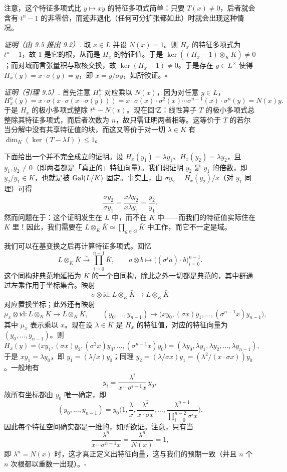 注意，这个特征多项式比 $y\mapsto xy$ 的特征多项式简单：只要 $T(x)\neq 0$，后者就会含有 $t^n-1$ 的非零倍，而迹非退化（任何可分扩张都如此）时就会出现这种情况。

\textit{证明（由 9.5 推出 9.2）.} 取 $x\in L$ 并设 $N(x)=1$。则 $H_x$ 的特征多项式为 $t^n-1$，故 $1$ 是它的根，从而是 $H_x$ 的特征值。于是 $\ker((H_x-1)\otimes_K\bar K)\neq 0$；而对域而言张量积与取核交换，故 $\ker(H_x-1)\neq 0$。于是存在 $y\in L^\times$ 使得 $H_x(y)=x\cdot\sigma(y)=y$，即 $x=y/\sigma y$，如所欲证。\hfill$\square$

\textit{证明（引理 9.5）.} 首先注意 $H_x^n$ 对应乘以 $N(x)$，因为对任意 $y\in L$，
\[
H_x^n(y)=x\cdot\sigma(x\cdot\sigma(x\cdots\sigma(y)))=x\cdot\sigma(x)\cdot\sigma^2(x)\cdots\sigma^{n-1}(x)\cdot\sigma^n(y)=N(x)y .
\]
于是 $H_x$ 的极小多项式整除 $t^n-N(x)$。现在回忆：线性算子 $T$ 的极小多项式总整除其特征多项式，而后者次数为 $n$，故只需证明两者相等。这等价于 $T$ 的若尔当分解中没有共享特征值的块，而这又等价于对一切 $\lambda\in K$ 有 $\dim_K(\ker(T-\lambda I))\le 1$。

下面给出一个并不完全成立的证明。设 $H_x(y_1)=\lambda y_1$、$H_x(y_2)=\lambda y_2$，且 $y_1,y_2\neq 0$（即两者都是「真正的」特征向量）。我们想证明 $y_2$ 是 $y_1$ 的倍数，即 $y_2/y_1\in K$，也就是被 $\operatorname{Gal}(L/K)$ 固定。事实上，由 $\sigma y_2=H_x(y_2)/x$（对 $y_1$ 同理）可得
\[
\frac{\sigma y_2}{\sigma y_1}=\frac{x\lambda y_2}{x\lambda y_1}=\frac{y_2}{y_1}.
\]
然而问题在于：这个证明发生在 $L$ 中，而不在 $K$ 中——而我们的特征值实际住在 $K$ 里！因此，我们需要在 $L\otimes_K\bar K\simeq\prod_{g\in G}\bar K$ 中工作，而它不一定是域。

我们可以在基变换之后再计算特征多项式。回忆
\[
L\otimes_K\bar K\xrightarrow{\sim}\prod_{i=0}^{n-1}\bar K,\qquad a\otimes b\mapsto\big((\sigma^ia)\cdot b\big)_{i=0}^{n-1}.
\]
这个同构非典范地延拓为 $\bar K$ 的一个自同构，除此之外一切都是典范的，其中群通过左乘作用于坐标集合。映射
\[
\sigma\otimes\mathrm{id}:L\otimes_K\bar K\to L\otimes_K\bar K
\]
对应置换坐标；此外还有映射
\[
\mu_x\otimes\mathrm{id}:L\otimes_K\bar K\to L\otimes_K\bar K,\qquad
(y_0,\dots,y_{n-1})\mapsto\big(xy_0,(\sigma x)y_1,\dots,(\sigma^{n-1}x)y_{n-1}\big),
\]
其中 $\mu_x$ 表示乘以 $x$。现在设 $\lambda\in\bar K$ 是 $H_x$ 的特征值，对应的特征向量为 $(y_0,\dots,y_{n-1})$。则
\[
H_x(y)=\big(xy_1,(\sigma x)y_2,(\sigma^2x)y_3,\dots,(\sigma^{n-1}x)y_0\big)
=(\lambda y_0,\lambda y_1,\lambda y_2,\dots,\lambda y_{n-1}),
\]
于是 $xy_1=\lambda y_0$，即 $y_1=(\lambda/x)y_0$；同理 $y_2=(\lambda/\sigma x)y_1=(\lambda^2/(x\cdot\sigma x))y_0$。一般地有
\[
y_i=\frac{\lambda^i}{x\cdots\sigma^{i-1}x}\,y_0,
\]
故所有坐标都由 $y_0$ 唯一确定，即
\[
(y_0,\dots,y_{n-1})=y_0\Big(1,\frac{\lambda}{x},\frac{\lambda^2}{x\cdot\sigma x},\dots,\frac{\lambda^{n-1}}{\prod_{i=0}^{n-2}\sigma^ix}\Big).
\]
因此每个特征空间确实都是一维的，如所欲证。注意，只有当
\[
\frac{\lambda^n}{x\cdots\sigma^{n-1}x}=\frac{\lambda^n}{N(x)}=1,
\]
即 $\lambda^n=N(x)$ 时，这才真正定义出特征向量，这与我们的预期一致（并且 $n$ 个 $n$ 次根都以重数一出现）。\hfill$\square$

